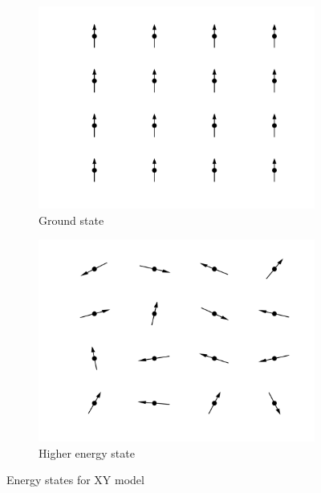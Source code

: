 \begin{figure}[h!]
\centering
    \begin{subfigure}{.4\textwidth}
        \centering
        \includegraphics[width=\linewidth]{figures/noPhaseShift.png}
        \caption{Ground state}
        \label{fig:xyground}
    \end{subfigure}%
    \begin{subfigure}{.4\textwidth}
        \centering
        \includegraphics[width=\linewidth]{figures/randomAngle.png}
        \caption{Higher energy state}
        \label{fig:xyhigher}
    \end{subfigure}
    \caption{Energy states for XY model}
\label{fig:xygroundhigher}
\end{figure}

